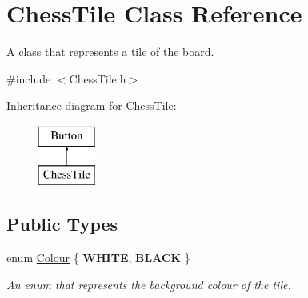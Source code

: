 \hypertarget{classChessTile}{}\section{Chess\+Tile Class Reference}
\label{classChessTile}


A class that represents a tile of the board.  




{\ttfamily \#include $<$Chess\+Tile.\+h$>$}

Inheritance diagram for Chess\+Tile\+:\begin{figure}[H]
\begin{center}
\leavevmode
\includegraphics[height=2.000000cm]{classChessTile}
\end{center}
\end{figure}
\subsection*{Public Types}
\begin{DoxyCompactItemize}
\item 
\mbox{\label{classChessTile_a9c573776c908586046e63facd4756e4d}} 
enum \mbox{\hyperlink{classChessTile_a9c573776c908586046e63facd4756e4d}{Colour}} \{ {\bfseries W\+H\+I\+TE}, 
{\bfseries B\+L\+A\+CK}
 \}
\begin{DoxyCompactList}\small\item\em An enum that represents the background colour of the tile. \end{DoxyCompactList}\end{DoxyCompactItemize}
